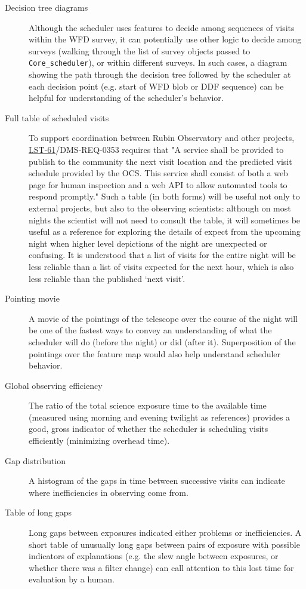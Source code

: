\begin{description}
\begin{description}
\end{description}
\item[{Decision tree diagrams}] Although the scheduler uses features to decide among sequences of visits within the WFD survey, it can potentially use other logic to decide among surveys (walking through the list of survey objects passed to \texttt{Core\_scheduler}), or within different surveys. In such cases,  a diagram showing the path through the decision tree followed by the scheduler at each decision point (e.g. start of WFD blob or DDF sequence) can be helpful for understanding of the scheduler's behavior.
\item[{Full table of scheduled visits}] To support coordination between Rubin Observatory and other projects, \href{https://ls.st/lse-61}{LST-61}/DMS-REQ-0353 requires that "A service shall be provided to publish to the community the next visit location and the predicted visit schedule provided by the OCS. This service shall consist of both a web page for human inspection and a web API to allow automated tools to respond promptly." Such a table (in both forms) will be useful not only to external projects, but also to the observing scientists: although on most nights the scientist will not need to consult the table, it will sometimes be useful as a reference for exploring the details of expect from the upcoming night when higher level depictions of the night are unexpected or confusing. It is understood that a list of visits for the entire night will be less reliable than a list of visits expected for the next hour, which is also less reliable than the published `next visit'. 
\item[{Pointing movie}] A movie of the pointings of the telescope over the course of the night will be one of the fastest ways to convey an understanding of what the scheduler will do (before the night) or did (after it). Superposition of the pointings over the feature map would also help understand scheduler behavior.
\item[{Global observing efficiency}] The ratio of the total science exposure time to the available time (measured using morning and evening twilight as references) provides a good, gross indicator of whether the scheduler is scheduling visits efficiently (minimizing overhead time).
\item[{Gap distribution}] A histogram of the gaps in time between successive visits can indicate where inefficiencies in observing come from.
\item[{Table of long gaps}] Long gaps between exposures indicated either problems or inefficiencies. A short table of unusually long gaps between pairs of exposure with possible indicators of explanations (e.g. the slew angle between exposures, or whether there was a filter change) can call attention to this lost time for evaluation by a human.

\end{description}
